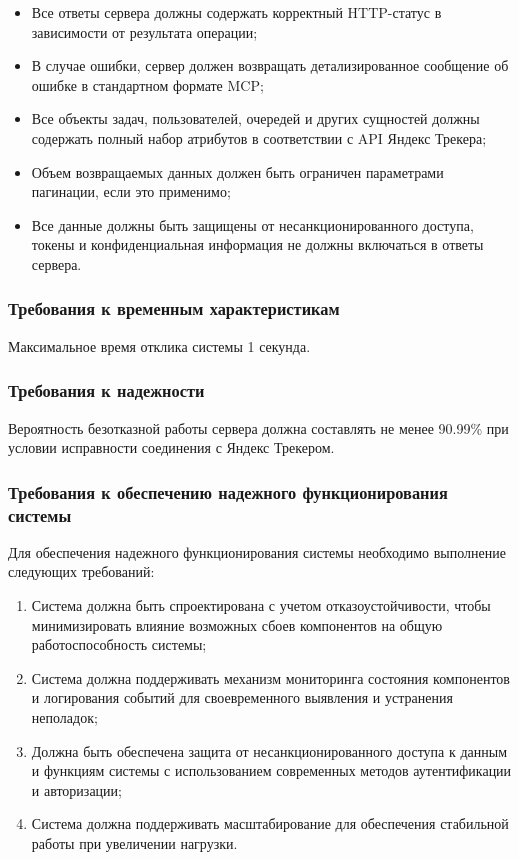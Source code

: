 \documentclass[utf8, russian]{eskdtext}
\begin{document}
\begin{itemize}
    \item Все ответы сервера должны содержать корректный HTTP-статус в зависимости от результата операции;
    \item В случае ошибки, сервер должен возвращать детализированное сообщение об ошибке в стандартном формате MCP;
    \item Все объекты задач, пользователей, очередей и других сущностей должны содержать полный набор атрибутов в соответствии с API Яндекс Трекера;
    \item Объем возвращаемых данных должен быть ограничен параметрами пагинации, если это применимо;
    \item Все данные должны быть защищены от несанкционированного доступа, токены и конфиденциальная информация не должны включаться в ответы сервера.
\end{itemize}

\subsubsection{Требования к временным характеристикам}
Максимальное время отклика системы 1 секунда.

\subsubsection{Требования к надежности}
Вероятность безотказной работы сервера должна составлять не менее 90.99\% при условии
исправности соединения с Яндекс Трекером.

\subsubsection{Требования к обеспечению надежного функционирования
системы}
Для обеспечения надежного функционирования системы необходимо выполнение следующих требований:
\begin{enumerate}
    \item Система должна быть спроектирована с учетом отказоустойчивости, чтобы минимизировать влияние возможных сбоев компонентов на общую работоспособность системы;
    \item Система должна поддерживать механизм мониторинга состояния компонентов и логирования событий для своевременного выявления и устранения неполадок;
    \item Должна быть обеспечена защита от несанкционированного доступа к данным и функциям системы с использованием современных методов аутентификации и авторизации;
    \item Система должна поддерживать масштабирование для обеспечения стабильной работы при увеличении нагрузки.
\end{enumerate}
\end{document}
